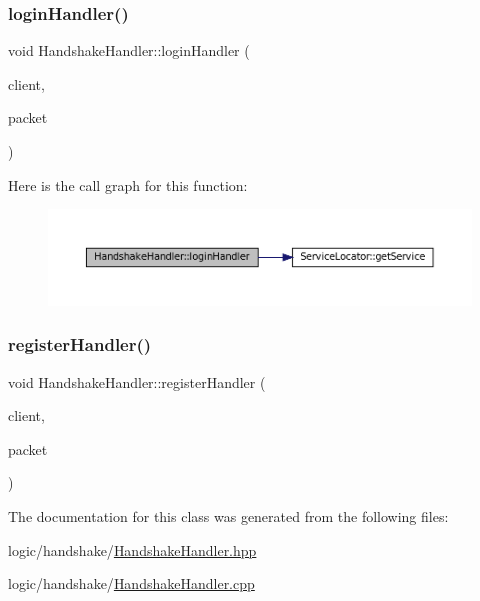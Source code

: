 \subsubsection{\texorpdfstring{login\+Handler()}{loginHandler()}}
{\footnotesize\ttfamily void Handshake\+Handler\+::login\+Handler (\begin{DoxyParamCaption}\item[{boost\+::shared\+\_\+ptr$<$ \mbox{\hyperlink{classClient}{Client}} $>$}]{client,  }\item[{std\+::unique\+\_\+ptr$<$ I\+Packet $>$ \&}]{packet }\end{DoxyParamCaption})\hspace{0.3cm}{\ttfamily [static]}}

Here is the call graph for this function\+:
\nopagebreak
\begin{figure}[H]
\begin{center}
\leavevmode
\includegraphics[width=350pt]{classHandshakeHandler_aef80330a36ad493211e1a4b2e321f3f1_cgraph}
\end{center}
\end{figure}
\mbox{\label{classHandshakeHandler_a1a93aa1ce4f7ca634f89dce9f30d29d8}} 
\subsubsection{\texorpdfstring{register\+Handler()}{registerHandler()}}
{\footnotesize\ttfamily void Handshake\+Handler\+::register\+Handler (\begin{DoxyParamCaption}\item[{boost\+::shared\+\_\+ptr$<$ \mbox{\hyperlink{classClient}{Client}} $>$}]{client,  }\item[{std\+::unique\+\_\+ptr$<$ I\+Packet $>$ \&}]{packet }\end{DoxyParamCaption})\hspace{0.3cm}{\ttfamily [static]}}



The documentation for this class was generated from the following files\+:\begin{DoxyCompactItemize}
\item 
logic/handshake/\mbox{\hyperlink{HandshakeHandler_8hpp}{Handshake\+Handler.\+hpp}}\item 
logic/handshake/\mbox{\hyperlink{HandshakeHandler_8cpp}{Handshake\+Handler.\+cpp}}\end{DoxyCompactItemize}
